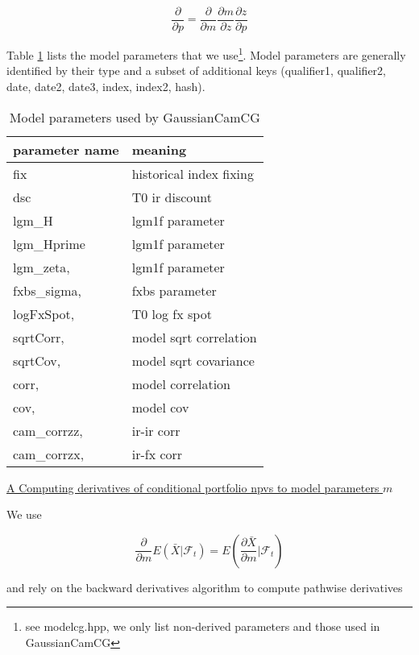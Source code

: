 $$
\frac{\partial}{\partial p} = \frac{\partial}{\partial m} \frac{\partial m}{\partial z} \frac{\partial z}{\partial p}
$$

Table \ref{tab:aad_modelparams} lists the model parameters that we use\footnote{see modelcg.hpp, we only list
non-derived parameters and those used in GaussianCamCG}. Model parameters are generally identified by their type and a
subset of additional keys (qualifier1, qualifier2, date, date2, date3, index, index2, hash).

\begin{table}[htb]
  \begin{tabular}{l|l}
            parameter name   & meaning \\
    \hline
            fix               & historical index fixing \\
            dsc               & T0 ir discount \\
            lgm\_H            & lgm1f parameter \\
            lgm\_Hprime       & lgm1f parameter \\
            lgm\_zeta,        & lgm1f parameter \\
            fxbs\_sigma,      & fxbs parameter \\
            logFxSpot,        & T0 log fx spot \\
            sqrtCorr,         & model sqrt correlation \\
            sqrtCov,          & model sqrt covariance \\
            corr,             & model correlation \\
            cov,              & model cov \\
            cam\_corrzz,      & ir-ir corr \\
            cam\_corrzx,      & ir-fx corr \\
    \hline
\end{tabular}
\caption{Model parameters used by GaussianCamCG}
\label{tab:aad_modelparams}
\end{table}

\underline{A Computing derivatives of conditional portfolio npvs to model parameters $m$}

We use

$$
\frac{\partial}{\partial m}E\left( \bar{X} \bigg| \mathcal{F}_t \right) = E\left( \frac{\partial \bar{X}}{\partial m} \bigg| \mathcal{F}_t \right)
$$

and rely on the backward derivatives algorithm to compute pathwise derivatives

